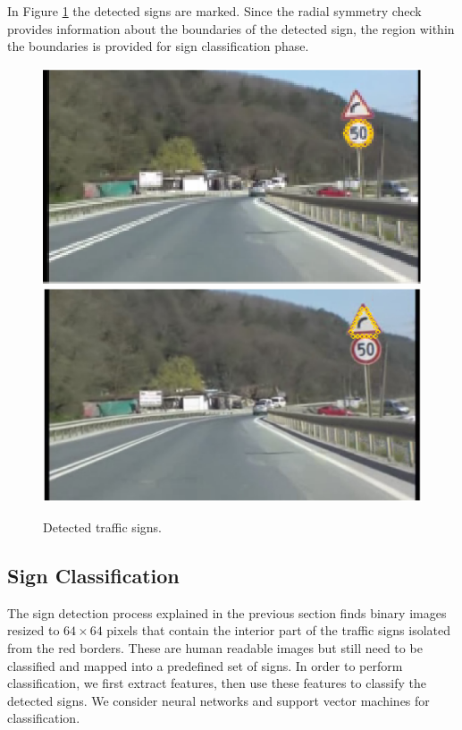 \documentclass[review,number]{elsarticle}
\begin{document}
In Figure \ref{signfig13} the detected signs are marked. Since the radial symmetry check provides information about the boundaries of the detected sign, the region within the boundaries is provided for sign classification phase.
\begin{figure}[ht]
\begin{center}
\includegraphics[scale=0.90]{img/signfig12.eps}
\includegraphics[scale=0.25]{img/signfig13.eps}
\caption{Detected traffic signs.}
\label{signfig13}
\end{center}
\end{figure}
\par

\subsection{Sign Classification}

The sign detection process explained in the previous section finds binary images resized to $64 \times 64$ pixels that contain the interior part of the traffic signs isolated from the red borders. These are human readable images but still need to be classified and mapped into a predefined set of signs. In order to perform classification, we first extract features, then use these features to classify the detected signs. We consider neural networks and support vector machines for classification.
\end{document}
